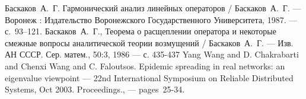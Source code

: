 \begin{thebibliography}{9}
  Баскаков~А.~Г. Гармонический анализ линейных операторов
    / Баскаков~А.~Г.
    --- Воронеж : Издательство Воронежского Государственного Университета,
        1987.
    ---  с.~93--121.
 Баскаков~А.~Г., Теорема о расщеплении оператора и некоторые смежные вопросы аналитической теории возмущений
    / Баскаков~А.~Г.
    --- Изв. АН СССР. Сер. матем., 50:3, 1986
    --- с. 435-437
  Yang Wang and D. Chakrabarti and Chenxi Wang and C. Faloutsos.
    Epidemic spreading in real networks: an eigenvalue viewpoint
        --- 22nd International Symposium on Reliable Distributed Systems, Oct 2003. Proceedings., --- pages~25-34.
\end{thebibliography}

